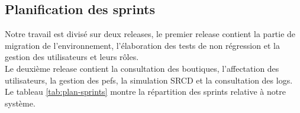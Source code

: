 \subsection[Planification des sprints]{Planification des sprints}
Notre travail est divisé sur deux releases, le premier release contient la partie de migration de l’environnement, l’élaboration des tests de non régression et la gestion des utilisateurs et leurs rôles.\\
Le deuxième release contient la consultation des boutiques, l’affectation des utilisateurs, la gestion des pefs, la simulation SRCD et la consultation des logs.\\
Le tableau \ref{tab:plan-sprints} montre la répartition des sprints relative à notre système.
